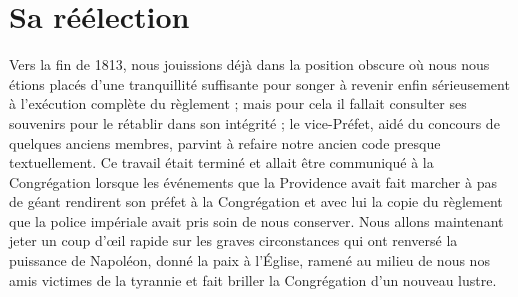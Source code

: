 \section*{Sa réélection}
Vers la fin de 1813, nous jouissions déjà dans la position obscure où nous nous étions placés d'une tranquillité suffisante pour songer à revenir enfin sérieusement à l'exécution complète du règlement ; mais pour cela il fallait consulter ses souvenirs pour le rétablir dans son intégrité ; le vice-Préfet, aidé du concours de
quelques anciens membres, parvint à refaire notre ancien code presque textuellement. Ce travail était terminé et allait être communiqué à la Congrégation lorsque les événements que la Providence avait fait marcher à pas de géant rendirent son préfet à la Congrégation et avec lui la copie du règlement que la police impériale avait pris soin de nous conserver. Nous allons maintenant jeter un coup d'œil rapide sur les graves circonstances qui ont renversé la puissance de Napoléon, donné la paix à l'Église, ramené au milieu de nous nos amis victimes de la tyrannie et fait briller la Congrégation d'un nouveau lustre.
